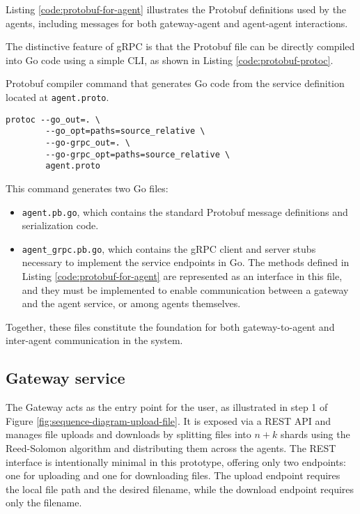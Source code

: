 Listing \ref{code:protobuf-for-agent} illustrates the Protobuf definitions used by the agents, including messages for both gateway-agent and agent-agent interactions.

The distinctive feature of gRPC is that the Protobuf file can be directly compiled into Go code using a simple CLI, as shown in Listing \ref{code:protobuf-protoc}.

\begin{listing}
\caption{Protobuf compiler command that generates Go code from the service definition located at \texttt{agent.proto}.}
\label{code:protobuf-protoc}
\begin{verbatim}
protoc --go_out=. \
        --go_opt=paths=source_relative \
        --go-grpc_out=. \
        --go-grpc_opt=paths=source_relative \
        agent.proto
\end{verbatim}
\end{listing}

This command generates two Go files: 
\begin{itemize}
    \item \texttt{agent.pb.go}, which contains the standard Protobuf message definitions and serialization code.
    \item \texttt{agent\_grpc.pb.go}, which contains the gRPC client and server stubs necessary to implement the service endpoints in Go. The methods defined in Listing \ref{code:protobuf-for-agent} are represented as an interface in this file, and they must be implemented to enable communication between a gateway and the agent service, or among agents themselves.
\end{itemize}

Together, these files constitute the foundation for both gateway-to-agent and inter-agent communication in the system.

\subsection{Gateway service} 

The Gateway acts as the entry point for the user, as illustrated in step 1 of Figure \ref{fig:sequence-diagram-upload-file}. It is exposed via a REST API and manages file uploads and downloads by splitting files into $n+k$ shards using the Reed-Solomon algorithm and distributing them across the agents. The REST interface is intentionally minimal in this prototype, offering only two endpoints: one for uploading and one for downloading files. The upload endpoint requires the local file path and the desired filename, while the download endpoint requires only the filename.

